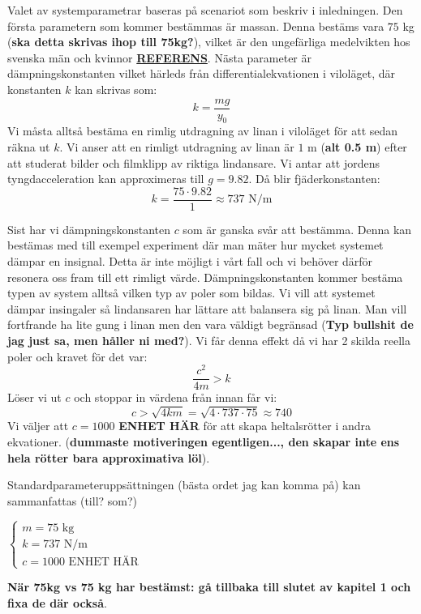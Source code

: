 Valet av systemparametrar baseras på scenariot som beskriv i inledningen. Den första parametern som kommer bestämmas är massan. Denna bestäms vara $75$ kg (\textbf{ska detta skrivas ihop till 75kg?}),  vilket är den ungefärliga medelvikten hos svenska män och kvinnor \href{http://www.scb.se/sv_/Hitta-statistik/Statistik-efter-amne/Levnadsforhallanden/Levnadsforhallanden/Undersokningarna-av-levnadsforhallanden-ULFSILC/12202/2012A02B/Behallare-for-Press/6-kilo-mer-man-och-4-kilo-mer-kvinna/}{\textbf{REFERENS}}.
Nästa parameter är dämpningskonstanten vilket härleds från differentialekvationen i viloläget, där konstanten $k$ kan skrivas som:
$$k=\frac{mg}{y_0}$$
Vi måsta alltså bestäma en rimlig utdragning av linan i viloläget för att sedan räkna ut $k$. Vi anser att en rimligt utdragning av linan är $1$ m (\textbf{alt 0.5 m}) efter att studerat bilder och filmklipp av riktiga lindansare. Vi antar att jordens tyngdacceleration kan approximeras till $g=9.82$. Då blir fjäderkonstanten:
$$k=\frac{75 \cdot 9.82}{1}\approx 737 \text{ N/m}$$

Sist har vi dämpningskonstanten $c$ som är ganska svår att bestämma. Denna kan bestämas med till exempel experiment där man mäter hur mycket systemet dämpar en insignal. Detta är inte möjligt i vårt fall och vi behöver därför resonera oss fram till ett rimligt värde. Dämpningskonstanten kommer bestäma typen av system alltså vilken typ av poler som bildas. Vi vill att systemet dämpar insingaler så lindansaren har lättare att balansera sig på linan. Man vill fortfrande ha lite gung i linan men den vara väldigt begränsad (\textbf{Typ bullshit de jag just sa, men håller ni med?}). Vi får denna effekt då vi har 2 skilda reella poler och kravet för det var:
$$\frac{c^2}{4m} > k $$
Löser vi ut $c$ och stoppar in värdena från innan får vi:
$$c>\sqrt{4km}=\sqrt{4\cdot 737\cdot 75} \approx 740$$
Vi väljer att $c=1000$ \textbf{ENHET HÄR} för att skapa heltalsrötter i andra ekvationer. (\textbf{dummaste motiveringen egentligen..., den skapar inte ens hela rötter bara approximativa löl}).

Standardparameteruppsättningen (bästa ordet jag kan komma på) kan sammanfattas (till? som?)

$\begin{cases}
m=75 \text{ kg} \\
k=737 \text{ N/m} \\
c=1000 \text{ ENHET HÄR}
\end{cases}$


\textbf{När 75kg vs 75 kg har bestämst: gå tillbaka till slutet av kapitel 1 och fixa de där också}.

